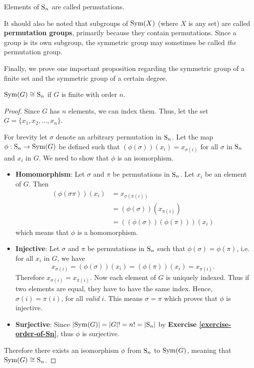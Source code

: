 \begin{remark}
    Elements of $\mathrm{S}_{n}$ are called permutations.
\end{remark}

It should also be noted that subgroups of $\mathrm{Sym}(X)$ (where $X$ is any set) are called \textbf{permutation groups}, primarily because they contain permutations. Since a group is its own subgroup, the symmetric group may sometimes be called \textit{the} permutation group.

Finally, we prove one important proposition regarding the symmetric group of a finite set and the symmetric group of a certain degree.
\begin{proposition}\label{prop-symmetric-group-of-finite-order}
    $\mathrm{Sym}(G) \cong \mathrm{S}_{n}$ if $G$ is finite with order $n$.
\end{proposition}
\begin{proof}
    Since $G$ has $n$ elements, we can index them. Thus, let the set $G = \{x_1, x_2, \dots, x_n\}$.

    For brevity let $\sigma$ denote an arbitrary permutation in $\mathrm{S}_{n}$. Let the map $\phi: \mathrm{S}_{n} \to \mathrm{Sym}(G)$ be defined such that $\left(\phi(\sigma)\right)(x_i) = x_{\sigma(i)}$ for all $\sigma$ in $\mathrm{S}_{n}$ and $x_i$ in $G$. We need to show that $\phi$ is an isomorphism.
    \begin{itemize}
        \item \textbf{Homomorphism}: Let $\sigma$ and $\pi$ be permutations in $\mathrm{S}_{n}$. Let $x_i$ be an element of $G$. Then
        \begin{align*}
            \left(\phi(\sigma \pi)\right)(x_i) &= x_{\sigma(\pi(i))}\\
            &= \left(\phi(\sigma)\right)\left(x_{\pi(i)}\right)\\
            &= \left(\left(\phi(\sigma)\right)\left(\phi(\pi)\right)\right)(x_i)
        \end{align*}
        which means that $\phi$ is a homomorphism.
        \item \textbf{Injective}: Let $\sigma$ and $\pi$ be permutations in $\mathrm{S}_{n}$ such that $\phi(\sigma) = \phi(\pi)$, i.e. for all $x_i$ in $G$, we have \[
        x_{\sigma(i)} = \left(\phi(\sigma)\right)(x_i) = \left(\phi(\pi)\right)(x_i) = x_{\pi(i)}.
        \]
        Therefore $x_{\sigma(i)} = x_{\pi(i)}$. Now each element of $G$ is uniquely indexed. Thus if two elements are equal, they have to have the same index. Hence, $\sigma(i) = \pi(i)$, for all \textit{valid} $i$. This means $\sigma = \pi$ which proves that $\phi$ is injective.
        \item \textbf{Surjective}: Since $|\mathrm{Sym}(G)| = |G|! = n! = |\mathrm{S}_{n}|$ by \textbf{Exercise \ref{exercise-order-of-Sn}}, thus $\phi$ is surjective.
    \end{itemize}

    Therefore there exists an isomorphism $\phi$ from $\mathrm{S}_{n}$ to $\mathrm{Sym}(G)$, meaning that $\mathrm{Sym}(G) \cong \mathrm{S}_{n}$.
\end{proof}

